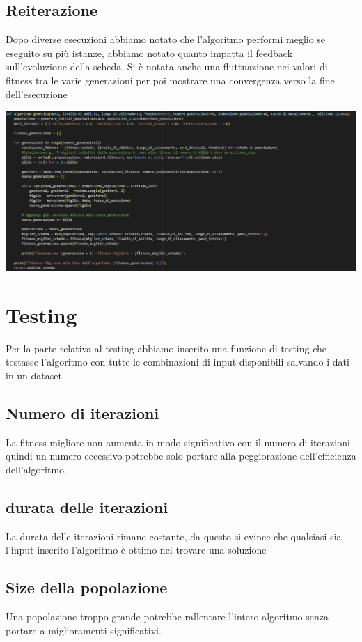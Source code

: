 \documentclass{book}
\begin{document}
  \subsection{Reiterazione}
  Dopo diverse esecuzioni abbiamo notato che l'algoritmo performi meglio se eseguito su più istanze, abbiamo notato quanto impatta il feedback sull'evoluzione della scheda. Si è notata anche una fluttuazione nei valori di fitness tra le varie generazioni per poi mostrare una convergenza verso la fine dell'esecuzione\newline
   


\includegraphics[width=1.0\linewidth]{Algoritmo.png}


  \section{Testing}
   Per la parte relativa al testing abbiamo inserito una funzione di testing che testasse l'algoritmo con tutte le combinazioni di input disponibili salvando i dati in un dataset

   \subsection{Numero di iterazioni}
   La fitness migliore non aumenta in modo significativo con il numero di iterazioni quindi un numero eccessivo potrebbe solo portare alla peggiorazione dell'efficienza dell'algoritmo.

   \subsection{durata delle iterazioni}
   La durata delle iterazioni rimane costante, da questo si evince che qualsiasi sia l'input inserito l'algoritmo è ottimo nel trovare una soluzione

   \subsection{Size della popolazione}
   Una popolazione troppo grande potrebbe rallentare l'intero algoritmo senza portare a miglioramenti significativi.
\end{document}
